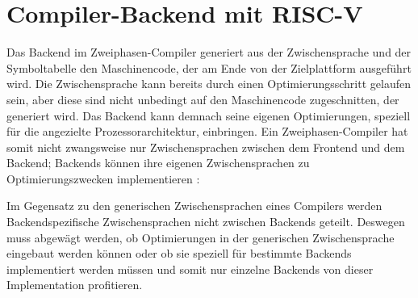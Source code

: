 \chapter{Compiler-Backend mit RISC-V}
\label{chap:theory:risc}

Das Backend im Zweiphasen-Compiler generiert aus der Zwischensprache und der Symboltabelle den Maschinencode, der am Ende von der Zielplattform ausgeführt wird.
Die Zwischensprache kann bereits durch einen Optimierungsschritt gelaufen sein, aber diese sind nicht unbedingt auf den Maschinencode zugeschnitten, der generiert wird.
Das Backend kann demnach seine eigenen Optimierungen, speziell für die angezielte Prozessorarchitektur, einbringen.
Ein Zweiphasen-Compiler hat somit nicht zwangsweise nur Zwischensprachen zwischen dem Frontend und dem Backend; Backends können ihre eigenen Zwischensprachen zu Optimierungszwecken implementieren \cite{aho:2006}:

\begin{figure}[H]
\end{figure}

Im Gegensatz zu den generischen Zwischensprachen eines Compilers werden Backendspezifische Zwischensprachen nicht zwischen Backends geteilt.
Deswegen muss abgewägt werden, ob Optimierungen in der generischen Zwischensprache eingebaut werden können oder
ob sie speziell für bestimmte Backends implementiert werden müssen und somit nur einzelne Backends von dieser Implementation profitieren.

